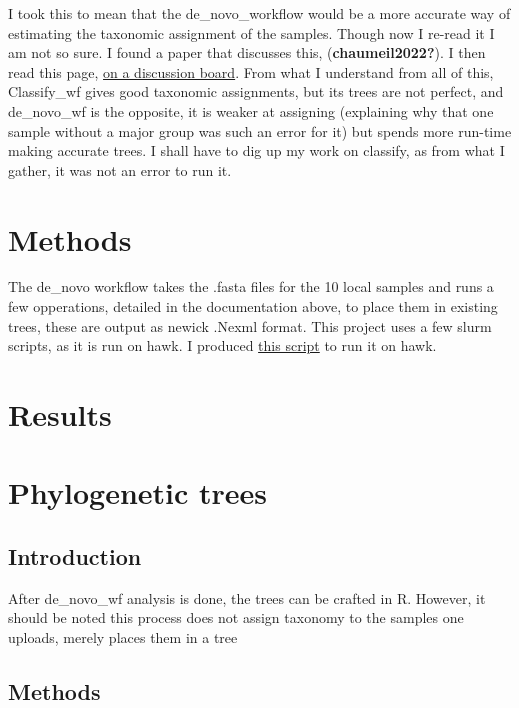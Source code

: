 \documentclass[
  letterpaper,
  DIV=11,
  numbers=noendperiod]{scrreprt}
\begin{document}
I took this to mean that the de\_novo\_workflow would be a more accurate
way of estimating the taxonomic assignment of the samples. Though now I
re-read it I am not so sure. I found a paper that discusses this,
(\textbf{chaumeil2022?}). I then read this page,
\href{https://forum.gtdb.ecogenomic.org/t/when-should-i-use-classify-wf-instead-of-da-novo-wf/518}{on
a discussion board}. From what I understand from all of this,
Classify\_wf gives good taxonomic assignments, but its trees are not
perfect, and de\_novo\_wf is the opposite, it is weaker at assigning
(explaining why that one sample without a major group was such an error
for it) but spends more run-time making accurate trees. I shall have to
dig up my work on classify, as from what I gather, it was not an error
to run it.

\section{Methods}\label{methods-6}

The de\_novo workflow takes the .fasta files for the 10 local samples
and runs a few opperations, detailed in the documentation above, to
place them in existing trees, these are output as newick .Nexml format.
This project uses a few slurm scripts, as it is run on hawk. I produced
\href{https://github.com/tobiasnunn/tnunn_research/blob/21f2fb071d76040dc82286b9399cb11ff11a3b3c/00_scripts/de_novo_gtdbtk.sh}{this
script} to run it on hawk.

\section{Results}\label{results-5}

\section{Phylogenetic trees}\label{phylogenetic-trees}

\subsection{Introduction}\label{introduction-9}

After de\_novo\_wf analysis is done, the trees can be crafted in R.
However, it should be noted this process does not assign taxonomy to the
samples one uploads, merely places them in a tree

\subsection{Methods}\label{methods-7}
\end{document}
